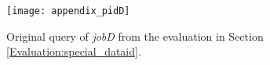 \documentclass[draft,final]{vutinfth} %
\begin{document}
\begin{figure}[h]
	\centering
	\texttt{[image: appendix\_pidD]}
	\caption{Original query of \textit{jobD} from the evaluation in Section \ref{Evaluation:special_dataid}.}
	\label{fig:appendix_pidD} %
\end{figure}

\backmatter


\listoffigures %

\cleardoublepage %
\listoftables %



\listoflistings




\printindex
\newpage
\printglossaries



\end{document}

